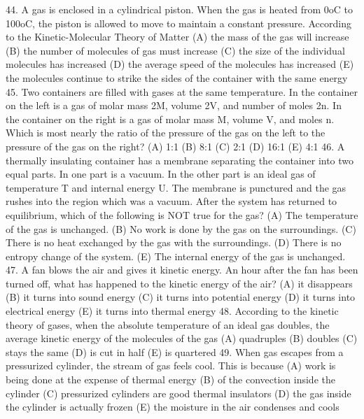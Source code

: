 44. A gas is enclosed in a cylindrical piston. When the gas is heated from 0oC to 100oC, the piston is allowed to
move to maintain a constant pressure. According to the Kinetic-Molecular Theory of Matter
(A) the mass of the gas will increase
(B) the number of molecules of gas must increase
(C) the size of the individual molecules has increased
(D) the average speed of the molecules has increased
(E) the molecules continue to strike the sides of the container with the same energy
45. Two containers are filled with gases at the same temperature. In the container on the left is a gas of molar mass
2M, volume 2V, and number of moles 2n. In the container on the right is a gas of molar mass M, volume V, and
moles n. Which is most nearly the ratio of the pressure of the gas on the left to the pressure of the gas on the
right?
(A) 1:1 (B) 8:1 (C) 2:1 (D) 16:1 (E) 4:1
46. A thermally insulating container has a membrane separating the container into two equal parts. In one part is a
vacuum. In the other part is an ideal gas of temperature T and internal energy U. The membrane is punctured
and the gas rushes into the region which was a vacuum. After the system has returned to equilibrium, which of
the following is NOT true for the gas?
(A) The temperature of the gas is unchanged.
(B) No work is done by the gas on the surroundings.
(C) There is no heat exchanged by the gas with the surroundings.
(D) There is no entropy change of the system.
(E) The internal energy of the gas is unchanged.
47. A fan blows the air and gives it kinetic energy. An hour after the fan has been turned off, what has happened to
the kinetic energy of the air?
(A) it disappears (B) it turns into sound energy (C) it turns into potential energy
(D) it turns into electrical energy (E) it turns into thermal energy
48. According to the kinetic theory of gases, when the absolute temperature of an ideal gas doubles, the average
kinetic energy of the molecules of the gas
(A) quadruples (B) doubles (C) stays the same (D) is cut in half (E) is quartered
49. When gas escapes from a pressurized cylinder, the stream of gas feels cool. This is because
(A) work is being done at the expense of thermal energy
(B) of the convection inside the cylinder
(C) pressurized cylinders are good thermal insulators
(D) the gas inside the cylinder is actually frozen
(E) the moisture in the air condenses and cools



